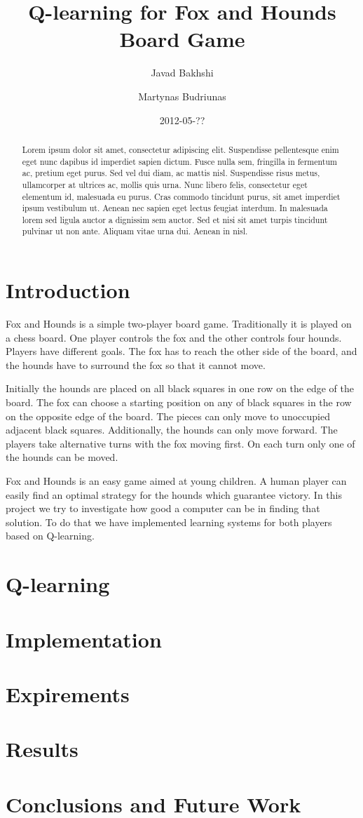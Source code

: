 \documentclass[a4paper]{article}
\title{Q-learning for Fox and Hounds Board Game}
\author{Javad Bakhshi \and Martynas Budriunas}
\date{2012-05-??}
\begin{document}
\maketitle

\begin{abstract}
Lorem ipsum dolor sit amet, consectetur adipiscing elit. Suspendisse
pellentesque enim eget nunc dapibus id imperdiet sapien dictum. Fusce nulla
sem, fringilla in fermentum ac, pretium eget purus. Sed vel dui diam, ac mattis
nisl. Suspendisse risus metus, ullamcorper at ultrices ac, mollis quis urna.
Nunc libero felis, consectetur eget elementum id, malesuada eu purus. Cras
commodo tincidunt purus, sit amet imperdiet ipsum vestibulum ut. Aenean nec
sapien eget lectus feugiat interdum. In malesuada lorem sed ligula auctor a
dignissim sem auctor. Sed et nisi sit amet turpis tincidunt pulvinar ut non
ante. Aliquam vitae urna dui. Aenean in nisl. 
\end{abstract}

\section{Introduction}
Fox and Hounds is a simple two-player board game. Traditionally it is played on
a chess board. One player controls the fox and the other controls four hounds.
Players have different goals. The fox has to reach the other side of the board,
and the hounds have to surround the fox so that it cannot move.

Initially the hounds are placed on all black squares in one row on the edge of
the board. The fox can choose a starting position on any of black squares in the
row on the opposite edge of the board. The pieces can only move to unoccupied
adjacent black squares. Additionally, the hounds can only move forward. The
players take alternative turns with the fox moving first. On each turn only one
of the hounds can be moved.

Fox and Hounds is an easy game aimed at young children. A human player can
easily find an optimal strategy for the hounds which guarantee victory. In this
project we try to investigate how good a computer can be in finding that
solution. To do that we have implemented learning systems for both players
based on Q-learning.

\section{Q-learning}

\section{Implementation}

\section{Expirements}

\section{Results}

\section{Conclusions and Future Work}

\begin{thebibliography}{9}
\end{thebibliography}
\end{document}
